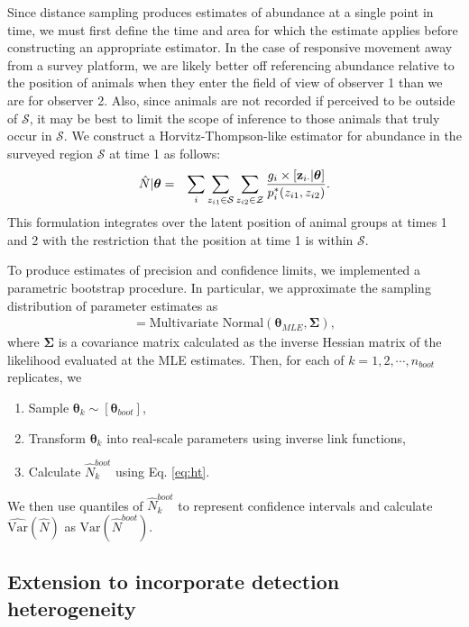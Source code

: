 \documentclass[12pt,fleqn]{article}
\begin{document}
Since distance sampling produces estimates of abundance at a single point in time, we must first define the time and area for which the estimate applies before constructing an appropriate estimator.  In the case of responsive movement away from a survey platform, we are likely better off referencing abundance relative to the position of animals when they enter the field of view of observer 1 than we are for observer 2.  Also, since animals are not recorded if perceived to be outside of $\mathcal{S}$, it may be best to limit the scope of inference to those animals that truly occur in $\mathcal{S}$.  We construct a Horvitz-Thompson-like estimator for abundance in the surveyed region $\mathcal{S}$ at time 1 as follows:
\begin{eqnarray}
  \hat{N}|\boldsymbol{\theta} & = & \sum_i \sum_{z_{i1} \in \mathcal{S}} \sum_{z_{i2} \in \mathcal{Z}} \frac{g_i \times [{\bf z}_{i \cdot} | \boldsymbol{\theta}]}{p_i^*(z_{i1},z_{i2})}.
  \label{eq:ht}
\end{eqnarray}
This formulation integrates over the latent position of animal groups at times 1 and 2 with the restriction that the position at time 1 is within $\mathcal{S}$.

To produce estimates of precision and confidence limits, we implemented a parametric bootstrap procedure. In particular, we approximate the sampling distribution of parameter estimates as
\begin{eqnarray*}
  [\boldsymbol{\theta}_{boot}] = \text{Multivariate Normal}(\boldsymbol{\theta}_{MLE},\boldsymbol{\Sigma}),
\end{eqnarray*}
where $\boldsymbol{\Sigma}$ is a covariance matrix calculated as the inverse Hessian matrix of the likelihood evaluated at the MLE estimates. Then, for each of $k = 1, 2, \cdots, n_{boot}$ replicates, we
\begin{enumerate}
  \item Sample $\boldsymbol{\theta}_k \sim [\boldsymbol{\theta}_{boot}]$,
  \item Transform $\boldsymbol{\theta}_k$ into real-scale parameters using inverse link functions,
  \item Calculate $\hat{N}_k^{boot}$ using Eq. \ref{eq:ht}.
\end{enumerate}
We then use quantiles of $\hat{N}_k^{boot}$ to represent confidence intervals and calculate $\hat{\text{Var}}(\hat{N})$ as $\text{Var}(\hat{N}^{boot})$.

\subsection{Extension to incorporate detection heterogeneity}
\end{document}
